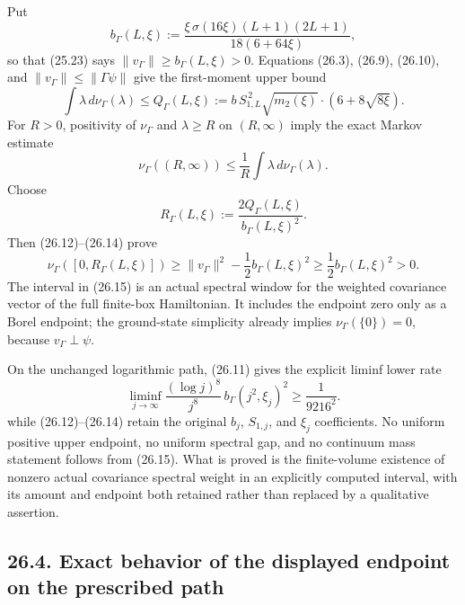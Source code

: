 \documentclass[
]{article}
\begin{document}
Put \[
 b_{\Gamma}(L,\xi):=
 \frac{\xi\,\sigma(16\xi)(L+1)(2L+1)}
 {18(6+64\xi)} ,
 \tag{26.11}
\] so that (25.23) says \(\|v_\Gamma\|\ge b_\Gamma(L,\xi)>0\). Equations
(26.3), (26.9), (26.10), and \(\|v_\Gamma\|\le\|\Gamma\psi\|\) give the
first-moment upper bound \[
 \int\lambda\,d\nu_\Gamma(\lambda)
 \le Q_{\Gamma}(L,\xi):=
 b\,S_{1,L}^{\,2}\sqrt{m_2(\xi)}
 \cdot\left(6+8\sqrt{8\xi}\right).
 \tag{26.12}
\] For \(R>0\), positivity of \(\nu_\Gamma\) and \(\lambda\ge R\) on
\((R,\infty)\) imply the exact Markov estimate \[
 \nu_\Gamma((R,\infty))
 \le\frac1R\int\lambda\,d\nu_\Gamma(\lambda).
 \tag{26.13}
\] Choose \[
 R_{\Gamma}(L,\xi):=
 \frac{2Q_{\Gamma}(L,\xi)}{b_{\Gamma}(L,\xi)^2}.
 \tag{26.14}
\] Then (26.12)--(26.14) prove \[
 \boxed{\displaystyle
 \nu_\Gamma([0,R_{\Gamma}(L,\xi)])
 \ge \|v_\Gamma\|^2-\frac12b_\Gamma(L,\xi)^2
 \ge\frac12b_\Gamma(L,\xi)^2>0 .}
 \tag{26.15}
\] The interval in (26.15) is an actual spectral window for the weighted
covariance vector of the full finite-box Hamiltonian. It includes the
endpoint zero only as a Borel endpoint; the ground-state simplicity
already implies \(\nu_\Gamma(\{0\})=0\), because \(v_\Gamma\perp\psi\).

On the unchanged logarithmic path, (26.11) gives the explicit liminf
lower rate \[
 \liminf_{j\to\infty}
 \frac{(\log j)^8}{j^8}\,b_\Gamma(j^2,\xi_j)^2
 \ge\frac1{9216^2}.
 \tag{26.16}
\] while (26.12)--(26.14) retain the original \(b_j\), \(S_{1,j}\), and
\(\xi_j\) coefficients. No uniform positive upper endpoint, no uniform
spectral gap, and no continuum mass statement follows from (26.15). What
is proved is the finite-volume existence of nonzero actual covariance
spectral weight in an explicitly computed interval, with its amount and
endpoint both retained rather than replaced by a qualitative assertion.

\subsection{26.4. Exact behavior of the displayed endpoint on the prescribed
path}\label{exact-behavior-of-the-displayed-endpoint-on-the-prescribed-path}
\end{document}
